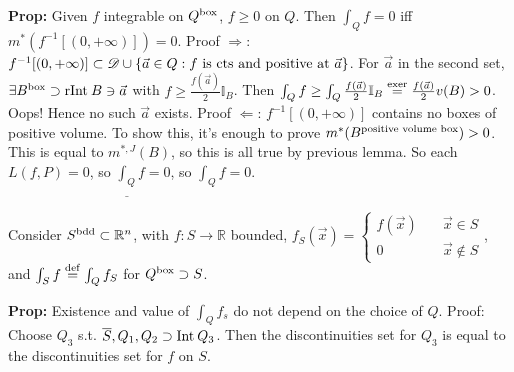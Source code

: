 \documentclass[10pt,letterpaper]{article}
\newcommand{\n}{\hfill\break}
\newcommand{\prop}[1]{\par\noindent\settowidth{\hangindent}{\textbf{Prop: }}\textbf{Prop: }#1\n}
\newcommand{\ptxt}[1]{\textrm{\textnormal{#1}}}
\newcommand{\set}[1]{\left\{#1\right\}}
\newcommand{\reals}{\mathbb{R}}
\newcommand{\R}{\reals}
\newcommand{\inv}{^{-1}}
\newcommand{\Int}{\ptxt{Int}\>}
\newcommand{\rInt}{\ptxt{rInt}\>}
\newcommand{\st}{s.t.}
\begin{document}
\prop{Given $f$ integrable on $Q^{\ptxt{box}}$, $f\ge{}0$ on $Q$.\n
Then $\int_{Q}f=0$ iff $m^{*}(f\inv[(0,+\infty)])=0$.\n
Proof $\Rightarrow$: $f\inv[(0,+\infty)]\subset\mathscr{D}\cup\set{\vec{a}\in{}Q:f\ptxt{ is cts and positive at }\vec{a}}$.\n
For $\vec{a}$ in the second set, $\exists{}B^{\ptxt{box}}\supset\rInt{}B\ni\vec{a}$ with $f\ge\frac{f(\vec{a})}{2}\mathbb{I}_{B}$.\n
Then $\int_{Q}f\ge\int_{Q}\frac{f(\vec{a})}{2}\mathbb{I}_{B}\overset{\ptxt{exer}}{=}\frac{f(\vec{a})}{2}v(B)>0$. Oops! Hence no such $\vec{a}$ exists.\n
\n
Proof $\Leftarrow$: $f\inv[(0,+\infty)]$ contains no boxes of positive volume. To show this, it's enough to prove $m^{*}(B^{\ptxt{positive volume box}})>0$. This is equal to $m^{*,J}(B)$, so this is all true by previous lemma.\n
So each $L(f,P)=0$, so $\underline{\int_{Q}}f=0$, so $\int_{Q}f=0$.}

\par\noindent Consider $S^{\ptxt{bdd}}\subset\R^{n}$, with $f:S\to\R$ bounded, $f_{S}(\vec{x})=\left\{\begin{array}{ll}f(\vec{x}) & \quad\vec{x}\in{}S\\ 0 & \quad\vec{x}\not\in{}S\end{array}\right.$, and\n
$\int_{S}f\overset{\ptxt{def}}{=}\int_{Q}f_{S}$ for $Q^{\ptxt{box}}\supset{}S$.\n

\prop{Existence and value of $\int_{Q}f_{s}$ do not depend on the choice of $Q$.\n
Proof: Choose $Q_{3}$ \st{} $\overline{S},Q_{1},Q_{2}\supset\Int{}Q_{3}$. Then the discontinuities set for $Q_{3}$ is equal to the discontinuities set for $f$ on $S$.}
\end{document}
